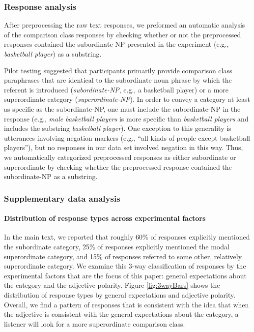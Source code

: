 \documentclass[doc]{apa6}
\begin{document}
\subsubsection{Response analysis}

After preprocessing the raw text responses, we preformed an automatic analysis of the comparison class responses by checking whether or not the preprocessed responses contained the subordinate NP presented in the experiment (e.g., \emph{basketball player}) as a substring. 

Pilot testing suggested that participants primarily provide comparison class paraphrases that are identical to the subordinate noun phrase by which the referent is introduced (\emph{subordinate-NP}, e.g., a basketball player) or a more superordinate category (\emph{superordinate-NP}). 
In order to convey a category at least as specific as the subordinate-NP, one must include the subordinate-NP in the response (e.g., \emph{male basketball players} is more specific than \emph{basketball players} and includes the substring \emph{basketball player}).
One exception to this generality is utterances involving negation markers (e.g., ``all kinds of people except basketball players''), but no responses in our data set involved negation in this way.
Thus, we automatically categorized preprocessed responses as either subordinate or superordinate by checking whether the preprocessed response contained the subordinate-NP as a substring.



\subsubsection{Supplementary data analysis}

\paragraph{Distribution of response types across experimental factors}

In the main text, we reported that roughly 60\% of responses explicitly mentioned the subordinate category, 25\% of responses explicitly mentioned the modal superordinate category, and 15\% of responses referred to some other, relatively superordinate category. We examine this 3-way classification of responses by the experimental factors that are the focus of this paper: general expectations about the category and the adjective polarity. 
Figure \ref{fig:3wayBars} shows the distribution of response types by general expectations and adjective polarity. Overall, we find a pattern of responses that is consistent with the idea that when the adjective is consistent with the general expectations about the category, a listener will look for a more superordinate comparison class. 
\end{document}
